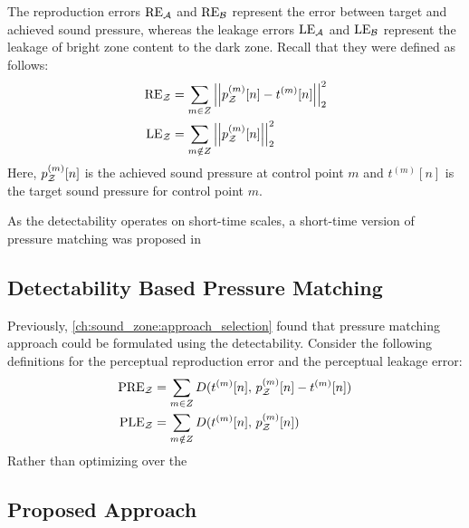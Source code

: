 The reproduction errors $\text{RE}_{\mathcal{A}}$ and $\text{RE}_{\mathcal{B}}$ represent the error between target and achieved sound pressure, whereas the leakage errors $\text{LE}_{\mathcal{A}}$ and $\text{LE}_{\mathcal{B}}$ represent 
the leakage of bright zone content to the dark zone.
Recall that they were defined as follows:
\begin{align}
    \text{RE}_\zz &= \sum_{m\in Z} \norm[2][2]{p_\zz^{(m)}[n] - t^{(m)}[n]} \\
    \text{LE}_\zz &= \sum_{m\notin Z} \norm[2][2]{p_\zz^{(m)}[n]} 
\end{align}
Here, $p_{\mathcal{Z}}^{(m)}[n]$ is the achieved sound pressure at control point $m$ and $t^{(m)}[n]$ is the target sound pressure for control point $m$. 

As the detectability operates on short-time scales, a short-time version of pressure matching was proposed in 

\subsection{Detectability Based Pressure Matching}
Previously, \autoref{ch:sound_zone:approach_selection} found that pressure matching approach could be formulated using the detectability.
Consider the following definitions for the perceptual reproduction error and the perceptual leakage error:
\begin{align}
    \text{PRE}_{\mathcal{Z}} &= \sum_{m\in Z} D(t^{(m)}[n],\,p_{\mathcal{Z}}^{(m)}[n] - t^{(m)}[n]) \\
    \text{PLE}_{\mathcal{Z}} &= \sum_{m\notin Z} D(t^{(m)}[n],\,p_{\mathcal{Z}}^{(m)}[n])  
\end{align}
Rather than optimizing over the 

\subsection{Proposed Approach}

